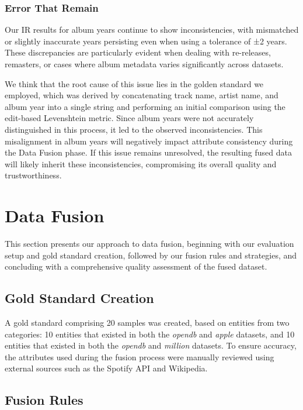 \documentclass[runningheads]{llncs}
\begin{document}
\subsubsection{Error That Remain}

Our IR results for album years continue to show inconsistencies, with mismatched or slightly inaccurate years persisting even when using a tolerance of ±2 years. These discrepancies are particularly evident when dealing with re-releases, remasters, or cases where album metadata varies significantly across datasets.

We think that the root cause of this issue lies in the golden standard we employed, which was derived by concatenating track name, artist name, and album year into a single string and performing an initial comparison using the edit-based Levenshtein metric. Since album years were not accurately distinguished in this process, it led to the observed inconsistencies. This misalignment in album years will negatively impact attribute consistency during the Data Fusion phase. If this issue remains unresolved, the resulting fused data will likely inherit these inconsistencies, compromising its overall quality and trustworthiness.

\section{Data Fusion}
This section presents our approach to data fusion, beginning with our evaluation setup and gold standard creation, followed by our fusion rules and strategies, and concluding with a comprehensive quality assessment of the fused dataset.

\subsection{Gold Standard Creation}
A gold standard comprising 20 samples was created, based on entities from two categories: 10 entities that existed in both the \textit{opendb} and \textit{apple} datasets, and 10 entities that existed in both the \textit{opendb} and \textit{million} datasets. To ensure accuracy, the attributes used during the fusion process were manually reviewed using external sources such as the Spotify API and Wikipedia.

\subsection{Fusion Rules}
\end{document}
